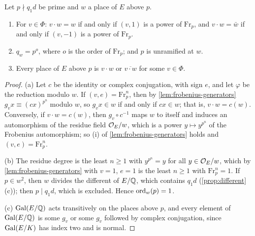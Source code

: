 \begin{proposition}[Decomposition]\label{prop:decomposition}
Let $p\nmid q_1d$ be prime and $w$ a place of $E$ above $p$.
\begin{enumerate}[label=\textup{(\alph*)}]
\item For $v\in\Phi$: $v\cdot w=w$ if and only if $(v,1)$ is a power of $\mathrm{Fr}_p$, and
$v\cdot w=\bar w$ if and only if $(v,-1)$ is a power of $\mathrm{Fr}_p$.
\item $q_w=p^{o}$, where $o$ is the order of $\mathrm{Fr}_p$; and $p$ is unramified at $w$.
\item Every place of $E$ above $p$ is $v\cdot w$ or $\overline{v\cdot w}$ for some $v\in\Phi$.
\end{enumerate}
\end{proposition}

\begin{proof}
(a) Let $c$ be the identity or complex conjugation, with sign $e$, and let $\varphi$ be the reduction
modulo $w$. If $(v,e)=\mathrm{Fr}_p^n$, then by \cref{lem:frobenius-generators} $g_vx\equiv(cx)^{p^n}$
modulo $w$, so $g_vx\in w$ if and only if $cx\in w$; that is, $v\cdot w=c(w)$. Conversely, if
$v\cdot w=c(w)$, then $g_v\circ c^{-1}$ maps $w$ to itself and induces an automorphism of the residue
field $\mathcal{O}_E/w$, which is a power $y\mapsto y^{p^n}$ of the Frobenius automorphism; so (i) of
\cref{lem:frobenius-generators} holds and $(v,e)=\mathrm{Fr}_p^n$.

(b) The residue degree is the least $n\ge1$ with $y^{p^n}=y$ for all $y\in\mathcal{O}_E/w$, which by
\cref{lem:frobenius-generators} with $v=1$, $e=1$ is the least $n\ge1$ with $\mathrm{Fr}_p^n=1$. If
$p\in w^2$, then $w$ divides the different of $E/\mathbb{Q}$, which contains $q_1d$
(\cref{prop:different}(c)); then $p\mid q_1d$, which is excluded. Hence $\operatorname{ord}_w(p)=1$.

(c) $\operatorname{Gal}(E/\mathbb{Q})$ acts transitively on the places above $p$, and every element of $\operatorname{Gal}(E/\mathbb{Q})$ is some
$g_v$ or some $g_v$ followed by complex conjugation, since $\operatorname{Gal}(E/K)$ has index two and is normal.
\end{proof}

